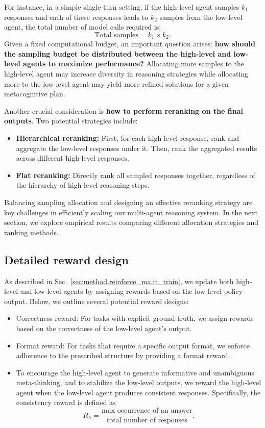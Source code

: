 For instance, in a simple single-turn setting, if the high-level agent samples \( k_1 \) responses and each of these responses leads to \( k_2 \) samples from the low-level agent, the total number of model calls required is:
\begin{equation*}
    \text{Total samples} = k_1 \times k_2.
\end{equation*}
Given a fixed computational budget, an important question arises: \textbf{how should the sampling budget be distributed between the high-level and low-level agents to maximize performance?} Allocating more samples to the high-level agent may increase diversity in reasoning strategies while allocating more to the low-level agent may yield more refined solutions for a given metacognitive plan.

Another crucial consideration is \textbf{how to perform reranking on the final outputs}. Two potential strategies include:

\begin{itemize}
    \item \textbf{Hierarchical reranking:} First, for each high-level response, rank and aggregate the low-level responses under it. Then, rank the aggregated results across different high-level responses.
    \item \textbf{Flat reranking:} Directly rank all sampled responses together, regardless of the hierarchy of high-level reasoning steps.
\end{itemize}

Balancing sampling allocation and designing an effective reranking strategy are key challenges in efficiently scaling our multi-agent reasoning system. In the next section, we explore empirical results comparing different allocation strategies and ranking methods.

\subsection{Detailed reward design}
\label{app:reward_design}

As described in Sec.~\ref{sec:method.reinforce_ma.it_train}, we update both high-level and low-level agents by assigning rewards based on the low-level policy output. Below, we outline several potential reward designs:
\begin{itemize}
    \item Correctness reward: For tasks with explicit ground truth, we assign rewards based on the correctness of the low-level agent’s output.
    \item Format reward: For tasks that require a specific output format, we enforce adherence to the prescribed structure by providing a format reward.
    \item To encourage the high-level agent to generate informative and unambiguous meta-thinking, and to stabilize the low-level outputs, we reward the high-level agent when the low-level agent produces consistent responses. Specifically, the consistency reward is defined as
    $$R_h = \frac{\text{max occurrence of an answer}}{\text{total number of responses}}.$$
\end{itemize}

